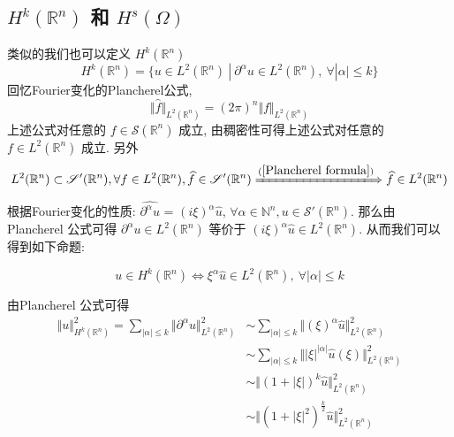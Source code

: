\documentclass[11pt]{ctexart}[UTF8]
\begin{document}
\subsection{$H^{k}(\mathbb{R}^{n})$ 和 $H^{s}(\Omega)$ }
类似的我们也可以定义 $H^{k}(\mathbb{R}^{n})$ 
\begin{equation*}
    H^{k}(\mathbb{R}^{n}) = \{ u \in L^{2}(\mathbb{R}^{n})\ |\ \partial^{\alpha}u \in L^{2}(\mathbb{R}^{n}),\ \forall |\alpha| \leq k \}
\end{equation*}
回忆Fourier变化的Plancherel公式, 
\begin{equation}\label{Plancherel formula}
    \Vert \widehat{f} \Vert_{L^{2}(\mathbb{R}^{n})} = (2\pi)^{n}\Vert f \Vert_{L^{2}(\mathbb{R}^{n})}
\end{equation}
上述公式对任意的 $f \in \mathscr{S}(\mathbb{R}^{n})$ 成立, 由稠密性可得上述公式对任意的 $f \in L^{2}(\mathbb{R}^{n})$ 成立. 另外
\begin{equation*}
    L^{2}(\mathbb{R}^{n}) \subset \mathscr{S}'(\mathbb{R}^{n}), \forall f \in L^{2}(\mathbb{R}^{n}), \widehat{f} \in \mathscr{S}'(\mathbb{R}^{n}) \xLongrightarrow{(\ref{Plancherel formula})} \widehat{f} \in L^{2}(\mathbb{R}^{n})
\end{equation*}
根据Fourier变化的性质: $\widehat{\partial^{\alpha}u}$ = $(i\xi)^{\alpha}\widehat{u}$, $\forall \alpha \in \mathbb{N}^{n}, u \in \mathscr{S}'(\mathbb{R}^{n})$.
那么由 Plancherel 公式可得 $\partial^{\alpha}u \in L^{2}(\mathbb{R}^{n})$ 等价于 $(i\xi)^{\alpha}\widehat{u} \in L^{2}(\mathbb{R}^{n})$. 从而我们可以得到如下命题:
\begin{proposition}
    \begin{equation*}
        u \in H^{k}(\mathbb{R}^{n}) \Longleftrightarrow \xi^{\alpha}\widehat{u} \in L^{2}(\mathbb{R}^{n}), \ \forall |\alpha| \leq k 
    \end{equation*}
\end{proposition}
由Plancherel 公式可得 
\begin{equation*}
    \begin{aligned}
        \Vert u \Vert_{H^{k}(\mathbb{R}^{n})}^2 = \sum_{|\alpha| \leq k} \Vert \partial^{\alpha}u \Vert_{L^{2}(\mathbb{R}^{n})}^2  &\sim \sum_{|\alpha| \leq k} \Vert (\xi)^{\alpha}\widehat{u} \Vert_{L^{2}(\mathbb{R}^{n})}^2\\
                                                                                                                                    &\sim \sum_{|\alpha| \leq k}\Vert |\xi|^{|\alpha|} \widehat{u}(\xi)\Vert_{L^{2}(\mathbb{R}^{n})}^2 \\
                                                                                                                                    &\sim \Vert (1+|\xi|)^{k}\widehat{u} \Vert_{L^{2}(\mathbb{R}^{n})}^2\\
                                                                                                                                    &\sim \Vert (1+|\xi|^{2})^{\frac{k}{2}}\widehat{u} \Vert_{L^{2}(\mathbb{R}^{n})}^2
    \end{aligned}
\end{equation*}
\end{document}
